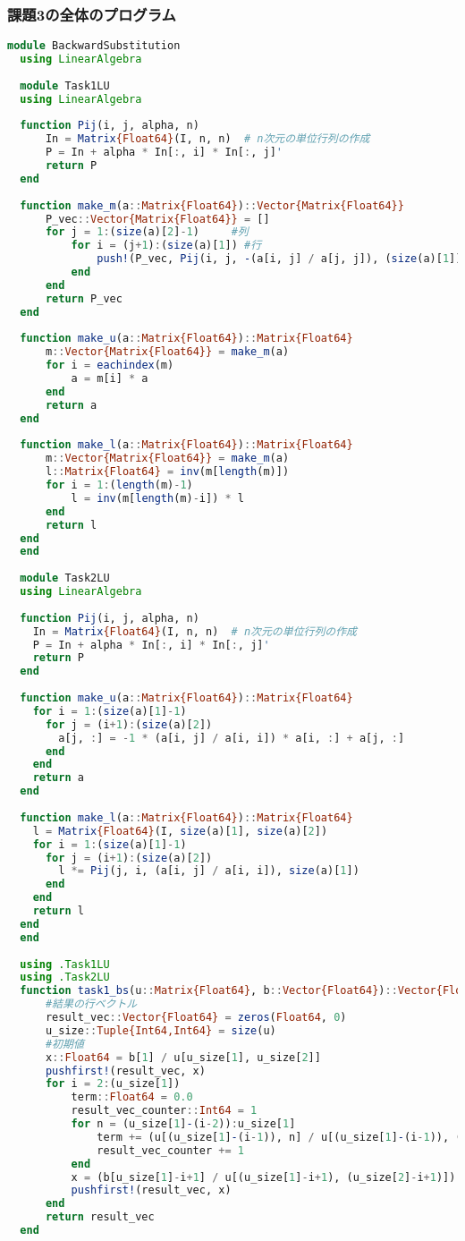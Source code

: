 \documentclass[uplatex, dvipdfmx, a4j,11pt]{jsarticle}
\begin{document}
\subsubsection*{課題3の全体のプログラム}
\begin{lstlisting}[title={課題3の全体のプログラム}, label=code:in, language=Julia]
module BackwardSubstitution
  using LinearAlgebra
  
  module Task1LU
  using LinearAlgebra
  
  function Pij(i, j, alpha, n)
      In = Matrix{Float64}(I, n, n)  # n次元の単位行列の作成
      P = In + alpha * In[:, i] * In[:, j]'
      return P
  end
  
  function make_m(a::Matrix{Float64})::Vector{Matrix{Float64}}
      P_vec::Vector{Matrix{Float64}} = []
      for j = 1:(size(a)[2]-1)     #列
          for i = (j+1):(size(a)[1]) #行
              push!(P_vec, Pij(i, j, -(a[i, j] / a[j, j]), (size(a)[1])))
          end
      end
      return P_vec
  end
  
  function make_u(a::Matrix{Float64})::Matrix{Float64}
      m::Vector{Matrix{Float64}} = make_m(a)
      for i = eachindex(m)
          a = m[i] * a
      end
      return a
  end
  
  function make_l(a::Matrix{Float64})::Matrix{Float64}
      m::Vector{Matrix{Float64}} = make_m(a)
      l::Matrix{Float64} = inv(m[length(m)])
      for i = 1:(length(m)-1)
          l = inv(m[length(m)-i]) * l
      end
      return l
  end
  end
  
  module Task2LU
  using LinearAlgebra
  
  function Pij(i, j, alpha, n)
    In = Matrix{Float64}(I, n, n)  # n次元の単位行列の作成
    P = In + alpha * In[:, i] * In[:, j]'
    return P
  end
  
  function make_u(a::Matrix{Float64})::Matrix{Float64}
    for i = 1:(size(a)[1]-1)
      for j = (i+1):(size(a)[2])
        a[j, :] = -1 * (a[i, j] / a[i, i]) * a[i, :] + a[j, :]
      end
    end
    return a
  end
  
  function make_l(a::Matrix{Float64})::Matrix{Float64}
    l = Matrix{Float64}(I, size(a)[1], size(a)[2])
    for i = 1:(size(a)[1]-1)
      for j = (i+1):(size(a)[2])
        l *= Pij(j, i, (a[i, j] / a[i, i]), size(a)[1])
      end
    end
    return l
  end
  end
  
  using .Task1LU
  using .Task2LU
  function task1_bs(u::Matrix{Float64}, b::Vector{Float64})::Vector{Float64}
      #結果の行ベクトル
      result_vec::Vector{Float64} = zeros(Float64, 0)
      u_size::Tuple{Int64,Int64} = size(u)
      #初期値
      x::Float64 = b[1] / u[u_size[1], u_size[2]]
      pushfirst!(result_vec, x)
      for i = 2:(u_size[1])
          term::Float64 = 0.0
          result_vec_counter::Int64 = 1
          for n = (u_size[1]-(i-2)):u_size[1]
              term += (u[(u_size[1]-(i-1)), n] / u[(u_size[1]-(i-1)), (u_size[2]-(i-1))]) * result_vec[result_vec_counter]
              result_vec_counter += 1
          end
          x = (b[u_size[1]-i+1] / u[(u_size[1]-i+1), (u_size[2]-i+1)]) - term
          pushfirst!(result_vec, x)
      end
      return result_vec
  end
  

\end{lstlisting}
\end{document}
